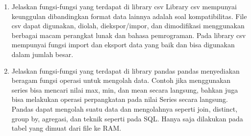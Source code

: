 \begin{enumerate}
\item Jelaskan fungsi-fungsi yang terdapat di library csv
 Library csv mempunyai keunggulan dibandingkan format data lainnya adalah soal kompatibilitas. File csv dapat digunakan, diolah, diekspor/impor, dan dimodifikasi menggunakan berbagai macam perangkat lunak dan bahasa pemrograman. Pada library csv mempunyai fungsi import dan eksport data yang baik dan bisa digunakan dalam jumlah besar.

\item Jelaskan fungsi-fungsi yang terdapat di library pandas
 pandas menyediakan beragam fungsi operasi untuk mengolah data. Contoh jika menggunakan series bisa mencari nilai max, min, dan mean secara langsung, bahkan juga bisa melakukan operasi perpangkatan pada nilai Series secara langsung.
Pandas dapat mengolah suatu data dan mengolahnya seperti join, distinct, group by, agregasi, dan teknik seperti pada SQL. Hanya saja dilakukan pada tabel yang dimuat dari file ke RAM.
\end{enumerate}



